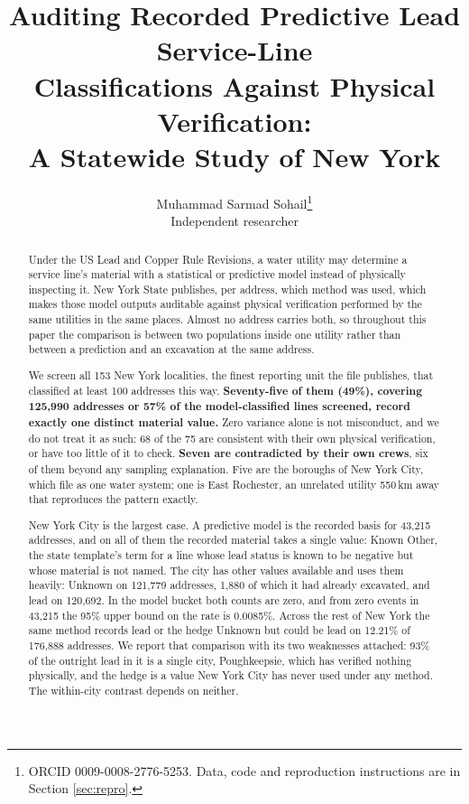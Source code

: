 \documentclass[11pt]{article}
\title{\bfseries Auditing Recorded Predictive Lead Service-Line\\
Classifications Against Physical Verification:\\
A Statewide Study of New York}
\author{Muhammad Sarmad Sohail\thanks{ORCID 0009-0008-2776-5253.
Data, code and reproduction instructions are in Section \ref{sec:repro}.}\\
\normalsize Independent researcher}
\date{}
\newcommand{\KO}{\textsf{Known Other}}
\newcommand{\CBL}{\textsf{Unknown but could be lead}}
\begin{document}
\maketitle

\begin{abstract}
\noindent
Under the US Lead and Copper Rule Revisions, a water utility may determine a service line's
material with a statistical or predictive model instead of physically inspecting it. New
York State publishes, per address, which method was used, which makes those model outputs
auditable against physical verification performed by the same utilities in the same places.
Almost no address carries both, so throughout this paper the comparison is between two
populations inside one utility rather than between a prediction and an excavation at the same
address.

We screen all 153 New York localities, the finest reporting unit the file publishes, that
classified at least 100 addresses this way. \textbf{Seventy-five of them (49\%), covering
125,990 addresses or 57\% of the model-classified lines screened, record exactly one distinct
material value.} Zero variance alone is not misconduct, and we do not treat it as such: 68 of
the 75 are consistent with their own physical verification, or have too little of it to check.
\textbf{Seven are contradicted by their own crews}, six of them beyond any sampling
explanation. Five are the boroughs of New York City, which file as one water system; one is
East Rochester, an unrelated utility 550\,km away that reproduces the pattern exactly.

New York City is the largest case. A predictive model is the recorded basis for 43,215
addresses, and on all of them the recorded material takes a single value: \KO{}, the state
template's term for a line whose lead status is known to be negative but whose material is
not named. The city has other values available and uses them heavily: \textsf{Unknown} on
121,779 addresses, 1,880 of which it had already excavated, and lead on 120,692. In the
model bucket both counts are zero, and from zero events in 43,215 the 95\% upper bound on the
rate is 0.0085\%. Across the rest of New York the same method records lead or the hedge \CBL{}
on 12.21\% of 176,888 addresses. We report that comparison with its two weaknesses attached:
93\% of the outright lead in it is a single city, Poughkeepsie, which has verified nothing
physically, and the hedge is a value New York City has never used under any method. The
within-city contrast depends on neither.


\end{abstract}
\end{document}

